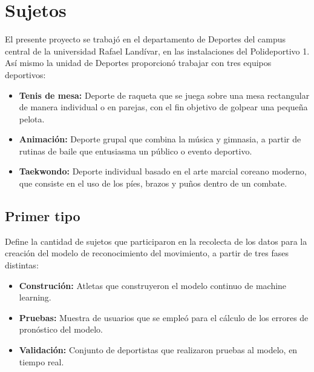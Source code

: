 \section{Sujetos}
El presente proyecto se trabaj\'o en el departamento de Deportes del campus central de la universidad Rafael Land\'ivar, en las instalaciones del Polideportivo 1. As\'i mismo la unidad de Deportes proporcion\'o trabajar con tres equipos deportivos:
\begin{itemize}
	\item \textbf{Tenis de mesa:} Deporte de raqueta que se juega sobre una mesa rectangular de manera individual o en parejas, con el fin objetivo de golpear una peque\~na pelota.
	\item \textbf{Animaci\'on:} Deporte grupal que combina la m\'usica y gimnasia, a partir de rutinas de baile que entusiasma un p\'ublico o evento deportivo.
	\item \textbf{Taekwondo:} Deporte individual basado en el arte marcial coreano moderno, que consiste en el uso de los p\'ies, brazos y pu\~nos dentro de un combate.
\end{itemize}
\subsection{Primer tipo} \label{sj:1t}
Define la cantidad de sujetos que participaron en la recolecta de los datos para la creaci\'on del modelo de reconocimiento del movimiento, a partir de tres fases distintas:
\begin{itemize}
	\item \textbf{Construci\'on:} Atletas que construyeron el modelo continuo de machine learning.
	\item \textbf{Pruebas:} Muestra de usuarios que se emple\'o para el c\'alculo de los errores de pron\'ostico del modelo.
	\item \textbf{Validaci\'on:} Conjunto de deportistas que realizaron pruebas al modelo, en tiempo real.
\end{itemize}
